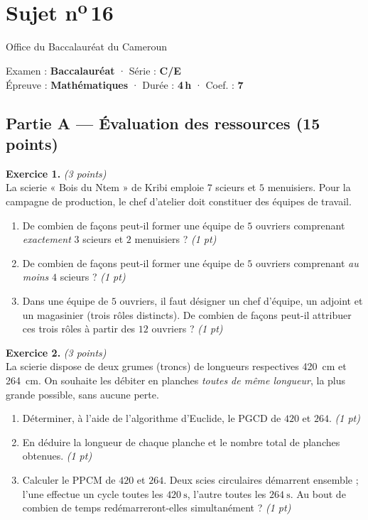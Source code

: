 \section{Sujet n\textsuperscript{o}\,16}
\noindent\begin{minipage}{0.5\linewidth}\footnotesize Office du Baccalauréat du Cameroun\end{minipage}%
\hfill\begin{minipage}{0.45\linewidth}\footnotesize\raggedleft Examen : \textbf{Baccalauréat} · Série : \textbf{C/E}\\
Épreuve : \textbf{Mathématiques} · Durée : \textbf{4\,h} · Coef. : \textbf{7}\end{minipage}
\par\smallskip{\color{onbo}\rule{\linewidth}{1pt}}

\subsection*{Partie A — Évaluation des ressources \hfill (15 points)}

\noindent\textbf{Exercice 1.} \hfill\textit{(3 points)}\\
La scierie « Bois du Ntem » de Kribi emploie $7$ scieurs et $5$ menuisiers. Pour la
campagne de production, le chef d'atelier doit constituer des équipes de travail.
\begin{enumerate}[label=\arabic*)]
\item De combien de façons peut-il former une équipe de $5$ ouvriers comprenant
\emph{exactement} $3$ scieurs et $2$ menuisiers ? \hfill\textit{(1 pt)}
\item De combien de façons peut-il former une équipe de $5$ ouvriers comprenant
\emph{au moins} $4$ scieurs ? \hfill\textit{(1 pt)}
\item Dans une équipe de $5$ ouvriers, il faut désigner un chef d'équipe, un
adjoint et un magasinier (trois rôles distincts). De combien de façons peut-il
attribuer ces trois rôles à partir des $12$ ouvriers ? \hfill\textit{(1 pt)}
\end{enumerate}

\smallskip
\noindent\textbf{Exercice 2.} \hfill\textit{(3 points)}\\
La scierie dispose de deux grumes (troncs) de longueurs respectives \SI{420}{\centi\metre}
et \SI{264}{\centi\metre}. On souhaite les débiter en planches \emph{toutes de même
longueur}, la plus grande possible, sans aucune perte.
\begin{enumerate}[label=\arabic*)]
\item Déterminer, à l'aide de l'algorithme d'Euclide, le PGCD de $420$ et $264$. \hfill\textit{(1 pt)}
\item En déduire la longueur de chaque planche et le nombre total de planches obtenues. \hfill\textit{(1 pt)}
\item Calculer le PPCM de $420$ et $264$. Deux scies circulaires démarrent
ensemble ; l'une effectue un cycle toutes les $\SI{420}{\second}$, l'autre toutes les
$\SI{264}{\second}$. Au bout de combien de temps redémarreront-elles
simultanément ? \hfill\textit{(1 pt)}
\end{enumerate}

